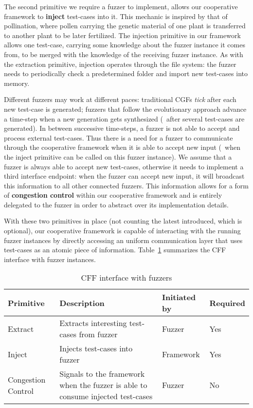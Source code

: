 The second primitive we require a fuzzer to implement, allows our cooperative
framework to \textbf{inject} test-cases into it. This mechanic is inspired by
that of pollination, where pollen carrying the genetic material of one plant is
transferred to another plant to be later fertilized. The injection primitive in
our framework allows one test-case, carrying some knowledge about the fuzzer
instance it comes from, to be merged with the knowledge of the receiving fuzzer
instance. As with the extraction primitive, injection operates through the file
system: the fuzzer needs to periodically check a predetermined folder and import
new test-cases into memory.

Different fuzzers may work at different paces: traditional \acp{CGF} \emph{tick}
after each new test-case is generated; fuzzers that follow the evolutionary
approach advance a time-step when a new generation gets synthesized (\eg~after
several test-cases are generated). In between successive time-steps, a fuzzer is
not able to accept and process external test-cases. Thus there is a need for a
fuzzer to communicate through the cooperative framework when it is able to
accept new input (\eg~when the inject primitive can be called on this fuzzer
instance). We assume that a fuzzer is always able to accept new test-cases,
otherwise it needs to implement a third interface endpoint: when the fuzzer can
accept new input, it will broadcast this information to all other connected
fuzzers. This information allows for a form of \textbf{congestion control}
within our cooperative framework and is entirely delegated to the fuzzer in
order to abstract over its implementation details.

With these two primitives in place (not counting the latest introduced, which is
optional), our cooperative framework is capable of interacting with the running
fuzzer instances by directly accessing an uniform communication layer that uses
test-cases as an atomic piece of information. Table~\ref{tab:system-primitives}
summarizes the \ac{CFF} interface with fuzzer instances.

\begin{table}[h]
    \centering
    \begin{tabularx}{\textwidth}{X >{\raggedright}p{} X p{}}
        \textbf{Primitive} & \textbf{Description} & \textbf{Initiated by} & \textbf{Required} \\
        \bottomrule
        Extract & Extracts interesting test-cases from fuzzer & Fuzzer & Yes \\
        Inject & Injects test-cases into fuzzer & Framework & Yes \\
        Congestion Control & Signals to the framework when the fuzzer is able to
            consume injected test-cases & Fuzzer & No
    \end{tabularx}
\caption{\acl{CFF} interface with fuzzers}
\label{tab:system-primitives}
\end{table}

